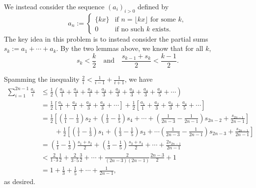 We instead consider the sequence $(a_i)_{i>0}$ defined by
\[a_n:=\begin{cases}\{kx\}&\text{if }n=\lfloor kx\rfloor\text{ for some }k,\\ 0&\text{if no such }k\text{ exists}.\end{cases}\]
The key idea in this problem is to instead consider the partial sums $s_k:=a_1+\cdots+a_k$. By the two lemmas above, we know that for all $k$, \[s_k<\frac k2\quad\text{and}\quad\frac{s_{k-1}+s_k}2<\frac{k-1}2.\]

Spamming the inequality $\frac2i<\frac1{i-1}+\frac1{i+1}$, we have
\begin{align*}
    \sum_{i=1}^{2n-1}\frac{a_i}i&\le\frac12\left(\frac{a_1}1+\frac{a_1}1+\frac{a_2}1+\frac{a_2}3+\frac{a_3}3+\frac{a_3}3+\frac{a_4}3+\frac{a_4}5+\cdots\right)\\
    &=\frac12\left[\frac{a_1}1+\frac{a_2}1+\frac{a_3}3+\frac{a_4}3+\cdots\right]+\frac12\left[\frac{a_1}1+\frac{a_2}3+\frac{a_3}3+\frac{a_4}5+\cdots\right]\\
    &=\frac12\left[\left(\frac11-\frac13\right)s_2+\left(\frac13-\frac15\right)s_4+\cdots+\left(\frac1{2n-3}-\frac1{2n-1}\right)s_{2n-2}+\frac{s_{2n-1}}{2n-1}\right]\\
    &\qquad+\frac12\left[\left(\frac11-\frac13\right)s_1+\left(\frac13-\frac15\right)s_3+\cdots\left(\frac1{2n-3}-\frac1{2n-1}\right)s_{2n-3}+\frac{s_{2n-1}}{2n-1}\right]\\
    &=\left(\frac11-\frac13\right)\frac{s_1+s_2}2+\left(\frac13-\frac15\right)\frac{s_3+s_4}2+\cdots+\frac{2s_{2n-1}}{2n-1}\\
    &<\frac2{1\cdot3}\frac12+\frac2{3\cdot5}\frac32+\cdots+\frac2{(2n-3)(2n-1)}\frac{2n-3}2+1\\
    &=1+\frac13+\frac15+\cdots+\frac1{2n-1},
\end{align*}
as desired.

